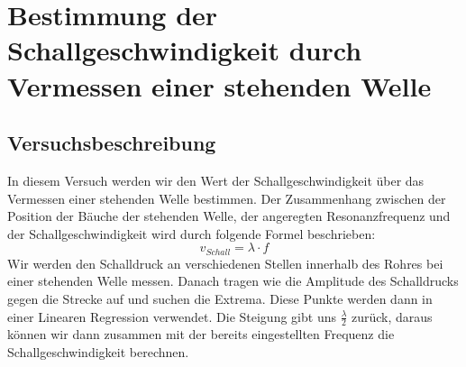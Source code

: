 \documentclass[12pt,a4paper]{article}
\author{Gruppe C14 \\ Julián Häck, Martin Koytek, Lars Wenning, Erik Zimmermann}
\begin{document}
\section{Bestimmung der Schallgeschwindigkeit durch Vermessen einer stehenden Welle}
\subsection{Versuchsbeschreibung}
In diesem Versuch werden wir den Wert der Schallgeschwindigkeit über das Vermessen einer stehenden Welle bestimmen. Der Zusammenhang zwischen der Position der Bäuche der stehenden Welle, der angeregten Resonanzfrequenz und der Schallgeschwindigkeit wird durch folgende Formel beschrieben:
\begin{equation}
v_{Schall} = \lambda\cdot f
\end{equation}
Wir werden den Schalldruck an verschiedenen Stellen innerhalb des Rohres bei einer stehenden Welle messen. Danach tragen wie die Amplitude des Schalldrucks gegen die Strecke auf und suchen die Extrema. Diese Punkte werden dann in einer Linearen Regression verwendet. Die Steigung gibt uns $\frac{\lambda}{2}$ zurück, daraus können wir dann zusammen mit der bereits eingestellten Frequenz die Schallgeschwindigkeit berechnen.
\end{document}
